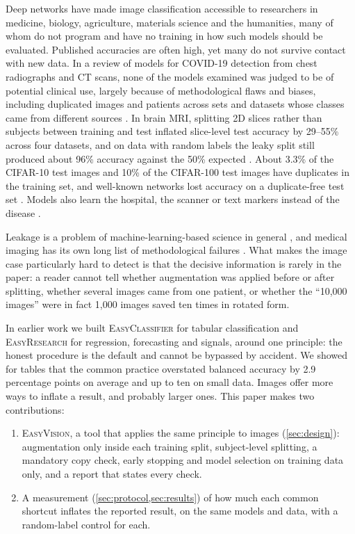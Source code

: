 \documentclass[11pt,a4paper]{article}
\newcommand{\EV}{\textsc{EasyVision}}
\newcommand{\EC}{\textsc{EasyClassifier}}
\newcommand{\ER}{\textsc{EasyResearch}}
\begin{document}
Deep networks have made image classification accessible to researchers in medicine, biology, agriculture, materials science and the humanities, many of whom do not program and have no training in how such models should be evaluated. Published accuracies are often high, yet many do not survive contact with new data. In a review of models for COVID-19 detection from chest radiographs and CT scans, none of the models examined was judged to be of potential clinical use, largely because of methodological flaws and biases, including duplicated images and patients across sets and datasets whose classes came from different sources \citep{roberts2021covid}. In brain MRI, splitting 2D slices rather than subjects between training and test inflated slice-level test accuracy by 29--55\% across four datasets, and on data with random labels the leaky split still produced about 96\% accuracy against the 50\% expected \citep{yagis2021leakage}. About 3.3\% of the CIFAR-10 test images and 10\% of the CIFAR-100 test images have duplicates in the training set, and well-known networks lost accuracy on a duplicate-free test set \citep{barz2020cifar}. Models also learn the hospital, the scanner or text markers instead of the disease \citep{zech2018pneumonia,geirhos2020shortcut,degrave2021shortcuts}.

Leakage is a problem of machine-learning-based science in general \citep{kapoor2023leakage}, and medical imaging has its own long list of methodological failures \citep{varoquaux2022failures}. What makes the image case particularly hard to detect is that the decisive information is rarely in the paper: a reader cannot tell whether augmentation was applied before or after splitting, whether several images came from one patient, or whether the ``10{,}000 images'' were in fact 1{,}000 images saved ten times in rotated form.

In earlier work we built \EC{} \citep{hassanat2026easyclassifierpaper} for tabular classification and \ER{} \citep{hassanat2026easyresearch} for regression, forecasting and signals, around one principle: the honest procedure is the default and cannot be bypassed by accident. We showed for tables that the common practice overstated balanced accuracy by 2.9 percentage points on average and up to ten on small data. Images offer more ways to inflate a result, and probably larger ones. This paper makes two contributions:
\begin{enumerate}
  \item \EV, a tool that applies the same principle to images (\cref{sec:design}): augmentation only inside each training split, subject-level splitting, a mandatory copy check, early stopping and model selection on training data only, and a report that states every check.
  \item A measurement (\cref{sec:protocol,sec:results}) of how much each common shortcut inflates the reported result, on the same models and data, with a random-label control for each.
\end{enumerate}
\end{document}
